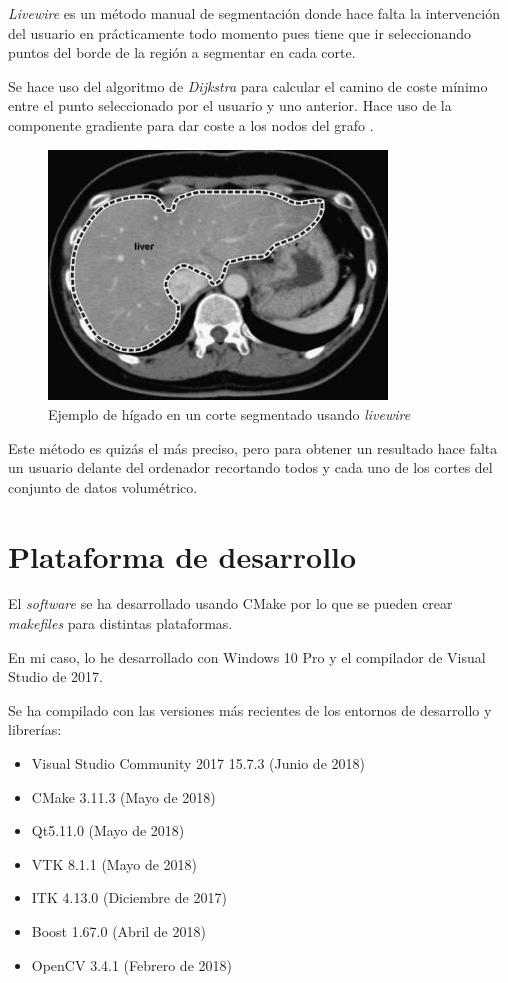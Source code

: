 \textit{Livewire} es un método manual de segmentación donde hace falta la intervención del usuario en prácticamente todo momento pues tiene que ir seleccionando puntos del borde de la región a segmentar en cada corte.

Se hace uso del algoritmo de \textit{Dijkstra} para calcular el camino de coste mínimo entre el punto seleccionado por el usuario y uno anterior. Hace uso de la componente gradiente para dar coste a los nodos del grafo \cite{mortensen95}.

\begin{figure}[H]
	\centering
	\includegraphics[width=9cm]{imagenes/desarrollo/livewire}
	\caption{Ejemplo de hígado en un corte segmentado usando \textit{livewire} \cite{toennies12}}
	\label{fig:desarrollo/livewire}
\end{figure}

Este método es quizás el más preciso, pero para obtener un resultado hace falta un usuario delante del ordenador recortando todos y cada uno de los cortes del conjunto de datos volumétrico.

\section{Plataforma de desarrollo}

El \textit{software} se ha desarrollado usando CMake \cite{cmake} por lo que se pueden crear \textit{makefiles} para distintas plataformas.

En mi caso, lo he desarrollado con Windows 10 Pro y el compilador de Visual Studio de 2017.

Se ha compilado con las versiones más recientes de los entornos de desarrollo y librerías:

\begin{itemize}
	\item Visual Studio Community 2017 15.7.3 (Junio de 2018)
	\item CMake 3.11.3 (Mayo de 2018)
	\item Qt5.11.0 (Mayo de 2018)
	\item VTK 8.1.1 (Mayo de 2018)
	\item ITK 4.13.0 (Diciembre de 2017)
	\item Boost 1.67.0 (Abril de 2018)
	\item OpenCV 3.4.1 (Febrero de 2018)
\end{itemize}

